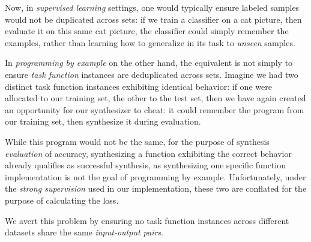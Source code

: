 \documentclass{article}
\begin{document}
Now, in \emph{supervised learning} settings,
one would typically ensure labeled samples would not be duplicated across sets:
if we train a classifier on a cat picture,
then evaluate it on this same cat picture,
the classifier could simply remember the examples,
rather than learning how to generalize in its task to \emph{unseen} samples.

In \emph{programming by example} on the other hand,
the equivalent is not simply to ensure \emph{task function} instances are deduplicated across sets.
Imagine we had two distinct task function instances exhibiting identical behavior:
if one were allocated to our training set, the other to the test set,
then we have again created an opportunity for our synthesizer to cheat:
it could remember the program from our training set,
then synthesize it during evaluation.

While this program would not be the same,
for the purpose of synthesis \emph{evaluation} of accuracy,
synthesizing a function exhibiting the correct behavior already qualifies as successful synthesis,
as synthesizing one specific function implementation is not the goal of programming by example.%
    Unfortunately, under the \emph{strong supervision} used in our implementation,
    these two are conflated for the purpose of calculating the loss.

We avert this problem by ensuring no task function instances across different datasets share the same \emph{input-output pairs}.




\end{document}
